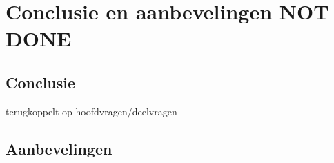 \chapter{Conclusie en aanbevelingen NOT DONE}
\section{Conclusie}
terugkoppelt op hoofdvragen/deelvragen

\section{Aanbevelingen}